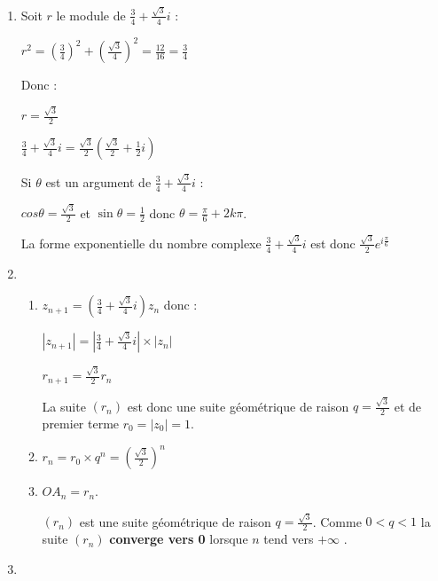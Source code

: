 \begin{corrige}
     \begin{enumerate}
          \item
          Soit $r$ le module de $\frac{3}{4}+\frac{\sqrt{3}}{4}i$ :
          \par
          $r^2=\left(\frac{3}{4}\right)^2+\left(\frac{\sqrt{3}}{4}\right)^2=\frac{12}{16}=\frac{3}{4}$
          \par
          Donc :
          \par
          $r=\frac{\sqrt{3}}{2}$
          \par
          $\frac{3}{4}+\frac{\sqrt{3}}{4}i=\frac{\sqrt{3}}{2}\left(\frac{\sqrt{3}}{2}+\frac{1}{2}i\right)$
          \par
          Si $\theta $ est un argument de  $\frac{3}{4}+\frac{\sqrt{3}}{4}i$ :
          \par
          $cos \theta  = \frac{\sqrt{3}}{2}$ et $\sin \theta  = \frac{1}{2}$ donc $\theta  = \frac{\pi }{6} + 2k\pi $.
          \par
          La forme exponentielle du nombre complexe $\frac{3}{4}+\frac{\sqrt{3}}{4}i$ est donc $\frac{\sqrt{3}}{2}e^{i\frac{\pi }{6}}$
          \item
          \begin{enumerate}[label=\alph*.]
               \item
               $ z_{n+1}=\left(\frac{3}{4}+\frac{\sqrt{3}}{4}i\right)z_{n}$ donc :
               \par
               $ |z_{n+1}|=\left|\frac{3}{4}+\frac{\sqrt{3}}{4}i\right|\times \left|z_{n}\right|$
               \par
               $r_{n+1}=\frac{\sqrt{3}}{2}r_{n}$
               \par
               La suite $\left(r_{n}\right)$ est donc une suite géométrique de raison $q=\frac{\sqrt{3}}{2}$ et de premier terme $r_{0}=|z_{0}|=1$.
               \item
               $r_{n}=r_{0}\times q^{n}=\left(\frac{\sqrt{3}}{2}\right)^{n}$
               \item
               $OA_{n}=r_{n}$.
               \par
               $\left(r_{n}\right)$ est une suite géométrique de raison $q=\frac{\sqrt{3}}{2}$. Comme $0 < q < 1$ la suite $\left(r_{n}\right)$ \textbf{converge vers 0} lorsque $n$ tend vers $+ \infty $ .
          \end{enumerate}
          \item
          \begin{enumerate}[label=\alph*.]

\end{enumerate}
\end{enumerate}
\end{corrige}
